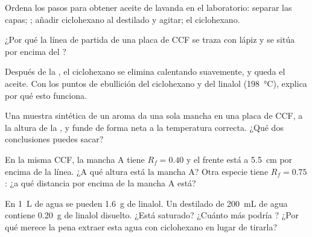 \begin{exercise}[$\star\star$]\label{exo:g10:chemical-species:10}
Ordena los pasos para obtener aceite de lavanda en el laboratorio:
separar las capas; ; añadir ciclohexano al destilado y
agitar;  el ciclohexano.
\end{exercise}

\begin{exercise}[$\star\star$]\label{exo:g10:chemical-species:11}
¿Por qué la línea de partida de una placa de CCF se traza con lápiz y se
sitúa por encima del ?
\end{exercise}

\begin{exercise}[$\star\star\star$]\label{exo:g10:chemical-species:12}
Después de la , el ciclohexano se elimina calentando
suavemente, y queda el aceite. Con los puntos de ebullición del
ciclohexano y del linalol (\qty{198}{\celsius}), explica por qué esto funciona.
\end{exercise}

\begin{exercise}[$\star\star\star$]\label{exo:g10:chemical-species:13}
Una muestra sintética de un aroma da una sola mancha en una placa de
CCF, a la altura de la , y funde de forma neta a la
temperatura correcta. ¿Qué dos conclusiones puedes sacar?
\end{exercise}

\begin{exercise}[$\star\star\star$]\label{exo:g10:chemical-species:14}
En la misma CCF, la mancha A tiene $R_f = 0.40$ y el frente está a
\qty{5.5}{cm} por encima de la línea. ¿A qué altura está la mancha A?
Otra especie tiene $R_f = 0.75$: ¿a qué distancia por encima de la
mancha A está?
\end{exercise}

\begin{exercise}[$\star\star\star$]\label{exo:g10:chemical-species:15}
En \qty{1}{L} de agua se pueden  \qty{1.6}{g} de linalol. Un
destilado de \qty{200}{mL} de agua contiene \qty{0.20}{g} de linalol
disuelto. ¿Está saturado? ¿Cuánto más podría ? ¿Por qué merece la
pena extraer esta agua con ciclohexano en lugar de tirarla?
\end{exercise}

